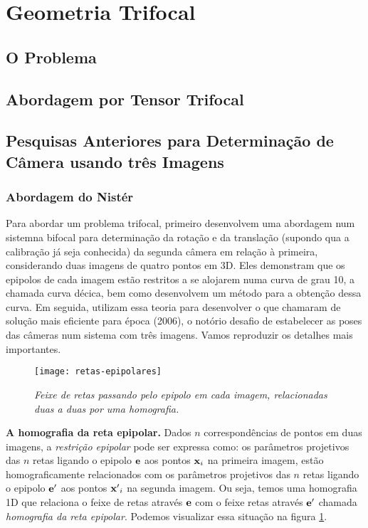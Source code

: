 \section{Geometria Trifocal}

\subsection{O Problema}

\subsection{Abordagem por Tensor Trifocal}

\subsection{Pesquisas Anteriores para Determinação de Câmera usando três Imagens}

\subsubsection{Abordagem do Nistér}

Para abordar um problema trifocal, primeiro \cite{2503343} desenvolvem uma abordagem num sistemna bifocal para determinação da rotação e da translação (supondo qua a calibração já seja conhecida) da segunda câmera em relação à primeira, considerando duas imagens de quatro pontos em 3D. Eles demonstram que os epipolos de cada imagem estão restritos a se alojarem numa curva de grau 10, a chamada curva décica, bem como desenvolvem um método para a obtenção dessa curva. Em seguida, utilizam essa teoria para desenvolver o que chamaram de solução mais eficiente para época (2006), o notório desafio de estabelecer as poses das câmeras num sistema com três imagens. Vamos reproduzir os detalhes mais importantes. 

\begin{figure}[!htb]
\centering
\texttt{[image: retas-epipolares]}
\caption{\textit{Feixe de retas passando pelo epipolo em cada imagem, relacionadas duas a duas por uma homografia.}}
\label{retas-epipolares}
\end{figure}

{\bf A homografia da reta epipolar.} Dados $n$ correspondências de pontos em duas imagens, a \textit{restrição epipolar} \citep{faugeras93three} pode ser expressa como: os parâmetros projetivos das $n$ retas ligando o epipolo ${\bf e}$ aos pontos ${\bf x}_i$ na primeira imagem, estão homograficamente relacionados com os parâmetros projetivos das $n$ retas ligando o epipolo ${\bf e'}$ aos pontos ${\bf x'}_i$ na segunda imagem. Ou seja, temos uma homografia 1D que relaciona o feixe de retas através ${\bf e}$ com o feixe retas através ${\bf e'}$ chamada \textit{homografia da reta epipolar}. Podemos visualizar essa situação na figura \ref{retas-epipolares}.


